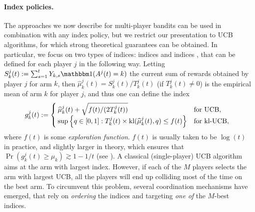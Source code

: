 \paragraph{Index policies.}
%
The approaches we now describe for multi-player bandits can be used in combination with any index policy, but we restrict our presentation to UCB algorithms, for which strong theoretical guarantees can be obtained. In particular, we focus on two types of indices:
\UCB{} indices \citep{Auer02}
and \klUCB{} indices \citep{KLUCBJournal}, that can be defined for each player $j$ in the following way.
%
Letting $S_k^j(t) := \sum_{s=1}^t Y_{k,s} \indic(A^j(t) = k)$ the current sum of rewards obtained by player $j$ for arm $k$,
then $\widehat{\mu}_k^j(t) = S_k^j(t)/T_k^j(t)$ (if $T_k^j(t)\neq 0$) is the empirical mean of arm $k$ for player $j$, and thus one can define the index
\begin{equation}\label{eq:5:indexFor_UCB_klUCB}
  g_k^j(t) := \begin{cases}
      \widehat{\mu}_k^j(t)  + \sqrt{  f(t) / (2T_k^j(t))}
      &\text{for } \mathrm{UCB}, \\
      \sup\left\{ q \in [0, 1]: T_k^j(t)\times \mathrm{kl}(\widehat{\mu}_k^j(t), q) \leq f(t) \right\}
      &\text{for } \mathrm{kl}\text{-}\mathrm{UCB},
  \end{cases}
\end{equation}
where $f(t)$ is some \emph{exploration function}. $f(t)$ is usually taken to be $\log(t)$ in practice, and slightly larger in theory, which ensures that  $\Pr(g_k^j(t) \geq \mu_k) \gtrsim 1 - 1/t$ (see \cite{KLUCBJournal}).
A classical (single-player) UCB algorithm aims at the arm with largest index. However, if each of the $M$ players selects the arm with largest UCB, all the players will end up colliding most of the time on the best arm.
To circumvent this problem, several coordination mechanisms have emerged, that rely on \emph{ordering} the indices and targeting \emph{one of} the $M$-best indices.


